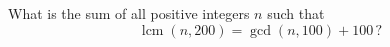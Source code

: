 What is the sum of all positive integers $n$ such that
\[\operatorname{lcm}(n,200)=\gcd(n,100)+100\,?\]
